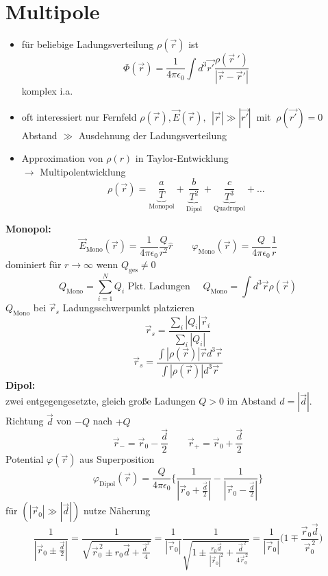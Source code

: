 \documentclass[titlepage,12pt,a4paper,ngerman]{report}
\newcommand{\tx}[1]{\textrm{#1}}
\begin{document}
\section{Multipole}
\begin{itemize}
\item für beliebige Ladungsverteilung $\rho(\vec{r})$ ist $$ \Phi (\vec{r}) = \frac{1}{4\pi\epsilon_0} \int d^3 \vec{r'} \frac{\rho(\vec{r}\: ')}{|\vec{r}-\vec{r}'|}$$ komplex i.a.
\item oft interessiert nur Fernfeld $\rho(\vec{r}), \vec{E}(\vec{r}),\ \ |\vec{r}| \gg | \vec{r'}|\ $ mit $\ \rho(\vec{r'}) = 0$\\
Abstand $\gg$ Ausdehnung der Ladungsverteilung
\item Approximation von $\rho(r)$ in Taylor-Entwicklung\\
$\rightarrow$ Multipolentwicklung
$$\rho(\vec{r}) = \underbrace{\frac{a}{T}}_{\tx{Monopol}} + \underbrace{\frac{b}{T^2}}_{\tx{Dipol}} + \underbrace{\frac{c}{T^3}}_{\tx{Quadrupol}} + \dots$$ 
\end{itemize}
\textbf{Monopol:}\\
$$\vec{E}_{\tx{Mono}}(\vec{r}) = \frac{1}{4\pi\epsilon_0} \frac{Q}{r^2} \hat{r} \qquad \varphi_{\tx{Mono}}(\vec{r}) = \frac{Q}{4\pi\epsilon_0} \frac{1}{r}$$
dominiert für $r\rightarrow\infty$ wenn $Q_{\tx{ges}} \neq 0$\\
$$Q_{\tx{Mono}} = \sum_{i=1}^N Q_i \textrm{ Pkt. Ladungen } \quad Q_{\tx{Mono}} = \int d^3\vec{r} \rho (\vec{r})$$
$Q_{\tx{Mono}}$ bei $\vec{r}_s$ Ladungsschwerpunkt platzieren\\
$$\vec{r}_s = \frac{\sum_i |Q_i| \vec{r}_i}{\sum_i | Q_i|}$$
$$\vec{r}_s = \frac{\int|\rho(\vec{r})| \vec{r} d^3 \vec{r}}{\int|\rho(\vec{r})| d^3\vec{r}}$$
\textbf{Dipol:}\\
zwei entgegengesetzte, gleich große Ladungen $Q>0$ im Abstand $d = |\vec{d}|$. Richtung $\vec{d}$ von $-Q$ nach $+Q$ 
$$\vec{r}_- = \vec{r}_0 - \frac{\vec{d}}{2} \qquad \vec{r}_+ = \vec{r}_0 + \frac{\vec{d}}{2}$$
Potential $\varphi(\vec{r})$ aus Superposition
$$\varphi_{\tx{Dipol}} (\vec{r}) = \frac{Q}{4 \pi \epsilon_0} \bigg\{ \frac{1}{|\vec{r}_0 + \frac{\vec{d}}{2}|} - \frac{1}{|\vec{r}_0 - \frac{\vec{d}}{2}|} \bigg\}$$ 
für $(|\vec{r}_0| \gg |\vec{d}|)$ nutze Näherung 
$$\frac{1}{|\vec{r}_0 \pm \frac{\vec{d}}{2}|} = \frac{1}{\sqrt{\vec{r}_0^{\,2} \pm r_0 \vec{d} + \frac{\vec{d}^2}{4}}} = \frac{1}{|\vec{r}_0|} \frac{1}{\sqrt{1 \pm \frac{r_0 \vec{d}}{|\vec{r}_0|^2} + \frac{\vec{d}^{\,2}}{4 \vec{r}_0^{\,2}}}} =  \frac{1}{|\vec{r}_0|} \bigg( 1 \mp \frac{\vec{r}_0 \vec{d}}{\vec{r}_0^{\,2}}\bigg)$$
\end{document}
